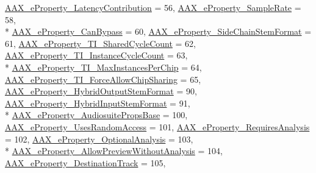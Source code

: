 \begin{DoxyCompactItemize}
\hyperlink{a00283_a6571f4e41a5dd06e4067249228e2249eaa9037ffd2caf892bafe8f7f170548cb4}{A\+A\+X\+\_\+e\+Property\+\_\+\+Latency\+Contribution} = 56, 
\hyperlink{a00283_a6571f4e41a5dd06e4067249228e2249eac5294e2feb18587d57b6ca0216a6bb1e}{A\+A\+X\+\_\+e\+Property\+\_\+\+Sample\+Rate} = 58, 
\\*
\hyperlink{a00283_a6571f4e41a5dd06e4067249228e2249ea6819867a9e86913e59decf318416d755}{A\+A\+X\+\_\+e\+Property\+\_\+\+Can\+Bypass} = 60, 
\hyperlink{a00283_a6571f4e41a5dd06e4067249228e2249eae71ad10ce55fb8c4076fe70315b689ae}{A\+A\+X\+\_\+e\+Property\+\_\+\+Side\+Chain\+Stem\+Format} = 61, 
\hyperlink{a00283_a6571f4e41a5dd06e4067249228e2249ea3e5b289333ba49f5a33de40d89fa4ade}{A\+A\+X\+\_\+e\+Property\+\_\+\+T\+I\+\_\+\+Shared\+Cycle\+Count} = 62, 
\hyperlink{a00283_a6571f4e41a5dd06e4067249228e2249ea5d8e5be9f3698a9c67a578c29da66405}{A\+A\+X\+\_\+e\+Property\+\_\+\+T\+I\+\_\+\+Instance\+Cycle\+Count} = 63, 
\\*
\hyperlink{a00283_a6571f4e41a5dd06e4067249228e2249ea5b85e213113b7f0f7ee4bac4f5eaa59d}{A\+A\+X\+\_\+e\+Property\+\_\+\+T\+I\+\_\+\+Max\+Instances\+Per\+Chip} = 64, 
\hyperlink{a00283_a6571f4e41a5dd06e4067249228e2249ea2f040408f0cc8d72f8069db8b3192ee7}{A\+A\+X\+\_\+e\+Property\+\_\+\+T\+I\+\_\+\+Force\+Allow\+Chip\+Sharing} = 65, 
\hyperlink{a00335_ga6571f4e41a5dd06e4067249228e2249eac30a4e73772e37267dfef39ae3122705}{A\+A\+X\+\_\+e\+Property\+\_\+\+Hybrid\+Output\+Stem\+Format} = 90, 
\hyperlink{a00335_ga6571f4e41a5dd06e4067249228e2249ea33a950bc2e02d38fc3be0a0ad8cc89b1}{A\+A\+X\+\_\+e\+Property\+\_\+\+Hybrid\+Input\+Stem\+Format} = 91, 
\\*
\hyperlink{a00283_a6571f4e41a5dd06e4067249228e2249eae774ad8d49f9d021fc39e7d9c6f08070}{A\+A\+X\+\_\+e\+Property\+\_\+\+Audiosuite\+Props\+Base} = 100, 
\hyperlink{a00283_a6571f4e41a5dd06e4067249228e2249eab0bbaabe0a03b37e5a69f04a6f306076}{A\+A\+X\+\_\+e\+Property\+\_\+\+Uses\+Random\+Access} = 101, 
\hyperlink{a00283_a6571f4e41a5dd06e4067249228e2249ea925c49bb79454b33bf1d5f4cb09d373f}{A\+A\+X\+\_\+e\+Property\+\_\+\+Requires\+Analysis} = 102, 
\hyperlink{a00283_a6571f4e41a5dd06e4067249228e2249ea5a2bacb421fc36f890a121f01a9e72ba}{A\+A\+X\+\_\+e\+Property\+\_\+\+Optional\+Analysis} = 103, 
\\*
\hyperlink{a00283_a6571f4e41a5dd06e4067249228e2249ea9524773361ca8e712bef3547e8c46c9b}{A\+A\+X\+\_\+e\+Property\+\_\+\+Allow\+Preview\+Without\+Analysis} = 104, 
\hyperlink{a00283_a6571f4e41a5dd06e4067249228e2249eadd8839e5678c8880215e318197cc8d3a}{A\+A\+X\+\_\+e\+Property\+\_\+\+Destination\+Track} = 105, 

\end{DoxyCompactItemize}
